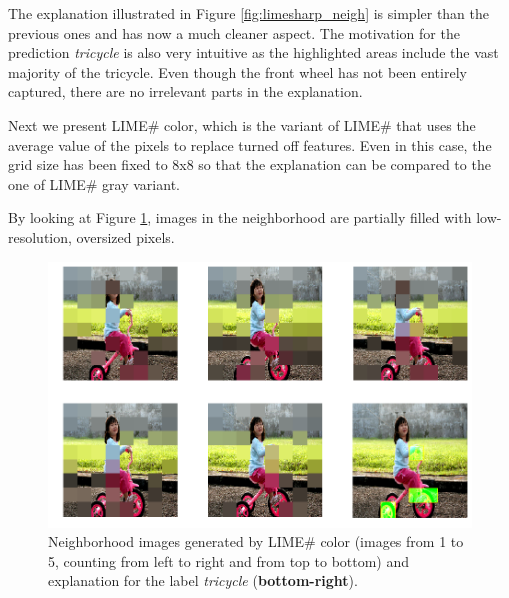 \documentclass[12pt, twoside, a4paper]{report}
\begin{document}
The explanation illustrated in Figure \ref{fig:limesharp_neigh} is simpler than the previous ones and has now a much cleaner aspect. The motivation for the prediction \textit{tricycle} is also very intuitive as the highlighted areas include the vast majority of the tricycle. Even though the front wheel has not been entirely captured, there are no irrelevant parts in the explanation.


\bigskip

Next we present LIME\# color, which is the variant of LIME\# that uses the average value of the pixels to replace turned off features. Even in this case, the grid size has been fixed to 8x8 so that the explanation can be compared to the one of LIME\# gray variant. 

By looking at Figure \ref{fig:limesharpcolor_neigh}, images in the neighborhood are partially filled with low-resolution, oversized pixels.

\begin{figure}
\begin{center}
\includegraphics[width=.85\textwidth]{images/limesharpcolor_neighborhood.png} 
\caption{Neighborhood images generated by LIME\# color (images from 1 to 5, counting from left to right and from top to bottom) and explanation for the label \textit{tricycle} (\textbf{bottom-right}).}
\label{fig:limesharpcolor_neigh}
\end{center}
\end{figure}
\end{document}
